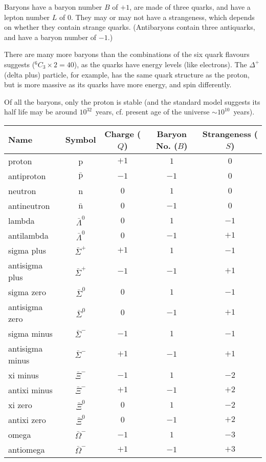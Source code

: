 \documentclass[a4paper,12pt]{article}
\begin{document}
Baryons have a baryon number $B$ of $+1$, are made of three quarks, and have a lepton number $L$ of $0$.  They may or may not have a strangeness, which depends on whether they contain strange quarks. (Antibaryons contain three antiquarks, and have a baryon number of $-1$.)

There are many more baryons than the combinations of the six quark flavours suggests ($^{6}C_{3}\times 2=40$), as the quarks have energy levels (like electrons).  The $\Delta^{+}$ (delta plus) particle, for example, has the same quark structure as the proton, but is more massive as its quarks have more energy, and spin differently.

Of all the baryons, only the proton is stable (and the standard model suggests its half life may be around $10^{32}$~years, cf. present age of the universe $\sim 10^{10}$~years).

\begin{tabular}{lcccc}
\hline
\hline
Name & Symbol & Charge ($Q$) & Baryon No. ($B$) & Strangeness ($S$)\\
\hline
proton & p & $+1$ & $1$ & $0$ \\
antiproton & $\bar{\mathrm{p}}$ & $-1$ & $-1$ & $0$ \\
neutron & n & $0$ & $1$ & $0$ \\
antineutron & $\bar{\mathrm{n}}$ & $0$ & $-1$ & $0$ \\
lambda & $\bar{\Lambda}^{0}$ & $0$ & $1$ & $-1$ \\
antilambda & $\bar{\Lambda}^{0}$ & $0$ & $-1$ & $+1$ \\
sigma plus & $\bar{\Sigma}^{+}$ & $+1$ & $1$ & $-1$ \\
antisigma plus & $\bar{\Sigma}^{+}$ & $-1$ & $-1$ & $+1$ \\
sigma zero & $\bar{\Sigma}^{0}$ & $0$ & $1$ & $-1$ \\
antisigma zero & $\bar{\Sigma}^{0}$ & $0$ & $-1$ & $+1$ \\
sigma minus & $\bar{\Sigma}^{-}$ & $-1$ & $1$ & $-1$ \\
antisigma minus & $\bar{\Sigma}^{-}$ & $+1$ & $-1$ & $+1$ \\
xi minus & $\bar{\Xi}^{-}$ & $-1$ & $1$ & $-2$ \\
antixi minus & $\bar{\Xi}^{-}$ & $+1$ & $-1$ & $+2$ \\
xi zero & $\bar{\Xi}^{0}$ & $0$ & $1$ & $-2$ \\
antixi zero & $\bar{\Xi}^{0}$ & $0$ & $-1$ & $+2$ \\
omega & $\bar{\Omega}^{-}$ & $-1$ & $1$ & $-3$ \\
antiomega & $\bar{\Omega}^{-}$ & $+1$ & $-1$ & $+3$ \\
\hline
\hline
\end{tabular}
\end{document}

